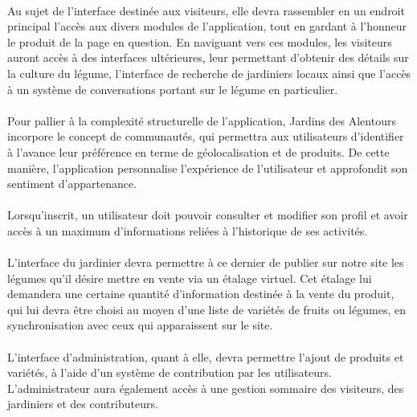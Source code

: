 \documentclass{scrreprt}
\def\projectname{Jardins des Alentours}
\begin{document}
\paragraph{}
Au sujet de l'interface destinée aux visiteurs, elle devra rassembler en un endroit principal
l'accès aux divers modules de l'application, tout en gardant à l'honneur
le produit de la page en question. En naviguant vers ces modules,
les visiteurs auront accès à des interfaces ultérieures, leur permettant d'obtenir
des détails sur la culture du légume, l'interface de recherche de jardiniers locaux ainsi que l'accès
à un système de conversations portant sur le légume en particulier.

\paragraph{}
Pour pallier à la complexité structurelle de l'application, \projectname{} incorpore
le concept de communautés, qui permettra aux utilisateurs d'identifier à l'avance leur préférence
en terme de géolocalisation et de produits. De cette manière, l'application
personnalise l'expérience de l'utilisateur et approfondit son sentiment d'appartenance.

\paragraph{}
Lorsqu'inscrit, un utilisateur doit pouvoir consulter et modifier son profil et
avoir accès à un maximum d'informations reliées à l'historique de ses activités.

\paragraph{}
L'interface du jardinier devra permettre à ce dernier de publier sur notre site
les légumes qu'il désire mettre en vente via un étalage virtuel. Cet étalage lui
demandera une certaine quantité d'information destinée à la vente du produit, qui lui devra être
choisi au moyen d'une liste de variétés de fruits ou légumes, en synchronisation avec ceux qui
apparaissent sur le site.

\paragraph{}
L'interface d'administration, quant à elle, devra permettre l'ajout de produits
et variétés, à l'aide d'un système de contribution par les utilisateurs.
L'administrateur aura également accès à une gestion sommaire des visiteurs,
des jardiniers et des contributeurs.
\end{document}
